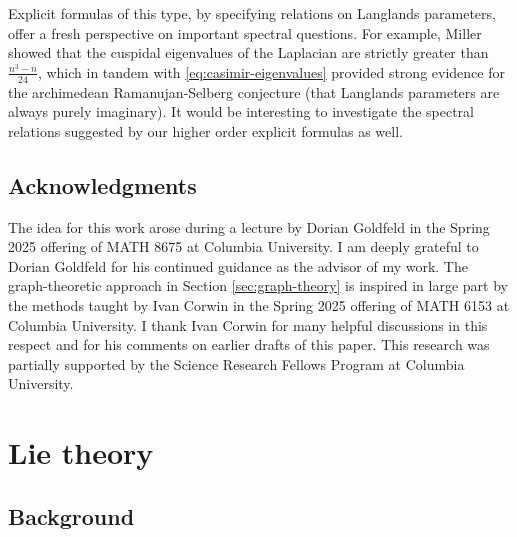 \documentclass[12pt, reqno, oneside]{amsart}
\numberwithin{equation}{section}
\begin{document}
Explicit formulas of this type, by specifying relations on Langlands parameters, offer a fresh perspective on important spectral questions. For example, Miller \cite[Theorem 1.2.2]{Mil97} showed that the cuspidal eigenvalues of the Laplacian are strictly greater than $\frac{n^3 -n}{24}$, which in tandem with \eqref{eq:casimir-eigenvalues} provided strong evidence for the archimedean Ramanujan-Selberg conjecture (that Langlands parameters are always purely imaginary). It would be interesting to investigate the spectral relations suggested by our higher order explicit formulas as well. 


%
%

\subsection*{Acknowledgments}

The idea for this work arose during a lecture by Dorian Goldfeld in the Spring 2025 offering of MATH 8675 at Columbia University. I am deeply grateful to Dorian Goldfeld for his continued guidance as the advisor of my work. The graph-theoretic approach in Section \ref{sec:graph-theory} is inspired in large part by the methods taught by Ivan Corwin in the Spring 2025 offering of MATH 6153 at Columbia University. I thank Ivan Corwin for many helpful discussions in this respect and for his comments on earlier drafts of this paper. This research was partially supported by the Science Research Fellows Program at Columbia University.


%
%

\section{Lie theory}\label{sec:lie-theory}

\subsection{Background}
\end{document}
